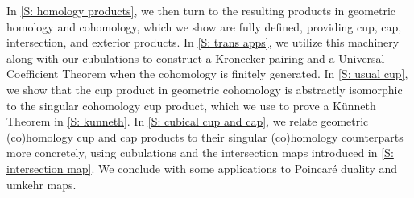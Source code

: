 In \cref{S: homology products}, we then turn to the resulting products in geometric homology and cohomology, which we show are fully defined, providing cup, cap, intersection, and exterior products.
In \cref{S: trans apps}, we utilize this machinery along with our cubulations to construct a Kronecker pairing and a Universal Coefficient Theorem when the cohomology is finitely generated.
In \cref{S: usual cup}, we show that the cup product in geometric cohomology is abstractly isomorphic to the singular cohomology cup product, which we use to prove a K\"unneth Theorem in \cref{S: kunneth}.
In \cref{S: cubical cup and cap}, we relate geometric (co)homology cup and cap products to their singular (co)homology counterparts more concretely, using cubulations and the intersection maps introduced in \cref{S: intersection map}.
We conclude with some applications to Poincar\'e duality and umkehr maps.

